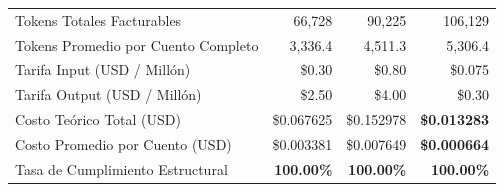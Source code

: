 \documentclass{article}
\begin{document}
\begin{table}[t]
\begin{tabular}{lrrr}
Tokens Totales Facturables & 66,728 & 90,225 & 106,129 \\
Tokens Promedio por Cuento Completo & 3,336.4 & 4,511.3 & 5,306.4 \\
\midrule
Tarifa Input (USD / Millón) & \$0.30 & \$0.80 & \$0.075 \\
Tarifa Output (USD / Millón) & \$2.50 & \$4.00 & \$0.30 \\
Costo Teórico Total (USD) & \$0.067625 & \$0.152978 & \textbf{\$0.013283} \\
Costo Promedio por Cuento (USD) & \$0.003381 & \$0.007649 & \textbf{\$0.000664} \\
Tasa de Cumplimiento Estructural & \textbf{100.00\%} & \textbf{100.00\%} & \textbf{100.00\%} \\
\bottomrule
\end{tabular}
\end{table}
\end{document}

